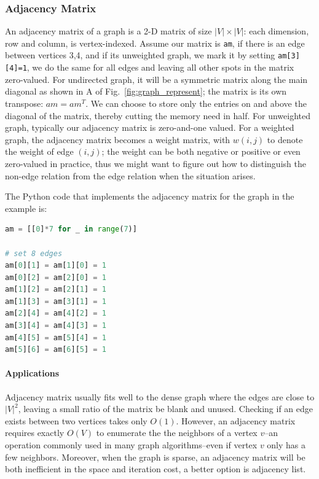 \documentclass[../main.tex]{subfiles}
\begin{document}
\subsubsection{Adjacency Matrix}
An adjacency matrix of a graph is a 2-D matrix of size $|V|\times|V|$: each dimension, row and column, is vertex-indexed. Assume our matrix is \texttt{am}, if there is an edge between vertices 3,4, and if its unweighted graph, we mark it by setting \texttt{am[3][4]=1}, we do the same for all edges and leaving all other spots in the matrix zero-valued.  For undirected graph, it will be a symmetric matrix along the main diagonal as shown in A of Fig.~\ref{fig:graph_represent}; the matrix is its own transpose: $am = {am}^T$. We can choose to store only the entries on and above the diagonal of the matrix, thereby cutting the memory need in half.   For unweighted graph, typically our adjacency matrix is zero-and-one valued. For a weighted graph, the adjacency matrix becomes a weight matrix, with $w(i, j)$ to denote the weight of edge $(i, j)$; the weight can be both negative or positive or even zero-valued in practice, thus we might want to figure out how to distinguish the non-edge relation from the edge relation when the situation arises. 

The Python code that implements the adjacency matrix for the graph in the example is:
\begin{lstlisting}[language=Python, numbers=none]
am = [[0]*7 for _ in range(7)]

# set 8 edges
am[0][1] = am[1][0] = 1
am[0][2] = am[2][0] = 1
am[1][2] = am[2][1] = 1
am[1][3] = am[3][1] = 1
am[2][4] = am[4][2] = 1
am[3][4] = am[4][3] = 1
am[4][5] = am[5][4] = 1
am[5][6] = am[6][5] = 1
\end{lstlisting}

\paragraph{Applications} Adjacency matrix usually fits well to the dense graph where the edges are close to $|V|^2$, leaving a small ratio of the matrix be blank and unused. Checking if an edge exists between two vertices takes only $O(1)$. However, an adjacency matrix requires exactly $O(V)$ to enumerate the the neighbors of a vertex $v$--an operation commonly used in many graph algorithms--even if vertex $v$ only has a few neighbors. Moreover, when the graph is sparse, an adjacency matrix will be both inefficient in the space and iteration cost, a better option is adjacency list. %
\end{document}
